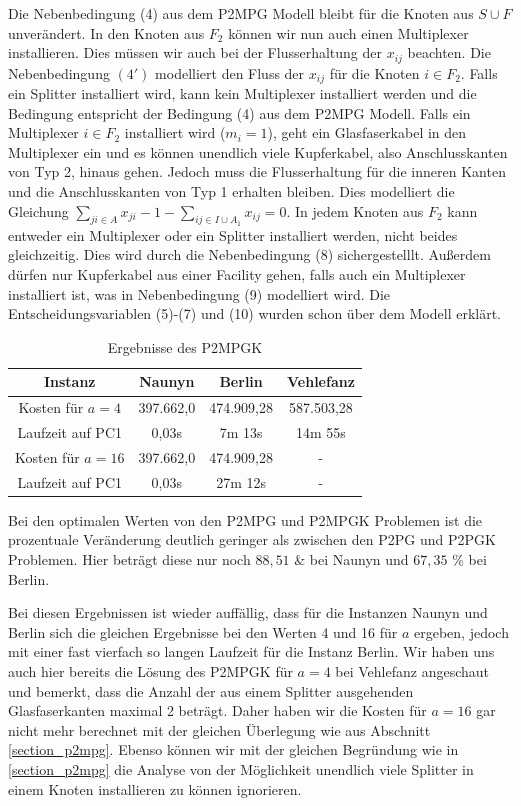 \documentclass[11pt,a4paper]{article}
\theoremstyle{my_th_style1}
\begin{document}
Die Nebenbedingung (4) aus dem P2MPG Modell bleibt für die Knoten aus $S \cup F$ unver\"andert.
In den Knoten aus $F_2$ können wir nun auch einen Multiplexer installieren.
Dies müssen wir auch bei der Flusserhaltung der $x_{ij}$ beachten.
Die Nebenbedingung \((4')\) modelliert den Fluss der $x_{ij}$ für die Knoten $i \in F_2$.
Falls ein Splitter installiert wird, kann kein Multiplexer installiert werden und die Bedingung entspricht der Bedingung (4) aus dem P2MPG Modell.
Falls ein Multiplexer $i \in F_2$ installiert wird ($m_i=1$), geht ein Glasfaserkabel in den Multiplexer ein und es k\"onnen unendlich viele Kupferkabel, also Anschlusskanten von Typ 2, hinaus gehen.
Jedoch muss die Flusserhaltung f\"ur die inneren Kanten und die Anschlusskanten von Typ 1 erhalten bleiben.
Dies modelliert die Gleichung $\displaystyle\sum_{ji \in A} x_{ji} -1 - \displaystyle\sum_{ij \in I \cup A_1} x_{ij}=0$.
In jedem Knoten aus $F_2$ kann entweder ein Multiplexer oder ein Splitter installiert werden, nicht beides gleichzeitig.
Dies wird durch die Nebenbedingung (8) sichergestelllt.
Außerdem d\"urfen nur Kupferkabel aus einer Facility gehen, falls auch ein Multiplexer installiert ist, was in Nebenbedingung (9) modelliert wird.
Die Entscheidungsvariablen (5)-(7) und (10) wurden schon \"uber dem Modell erkl\"art.   

 \begin{table}[h]
	\centering
	\begin{tabular}{c|c|c|c}
		Instanz & Naunyn & Berlin & Vehlefanz \\	
		\hline
		Kosten für $a=4$ & 397.662,0 & 474.909,28 & 587.503,28 \\
		Laufzeit auf PC1 & 0,03s & 7m 13s & 14m 55s \\
		\hline
		Kosten für $a=16$ & 397.662,0 & 474.909,28 & -\\
		Laufzeit auf PC1 & 0,03s & 27m 12s & - \\
	\end{tabular}
	\caption{Ergebnisse des P2MPGK}
	\label{P2MPGK}
\end{table}

Bei den optimalen Werten von den P2MPG und P2MPGK Problemen ist die prozentuale Ver\"anderung deutlich geringer als zwischen den P2PG und P2PGK Problemen.
Hier betr\"agt diese nur noch \(88,51\) \& bei Naunyn und \(67,35\) \% bei Berlin.

Bei diesen Ergebnissen ist wieder auff\"allig, dass f\"ur die Instanzen Naunyn und Berlin sich die gleichen Ergebnisse bei den Werten 4 und 16 f\"ur \(a\) ergeben, jedoch mit einer fast vierfach so langen Laufzeit f\"ur die Instanz Berlin.
Wir haben uns auch hier bereits die L\"osung des P2MPGK f\"ur \(a=4\) bei Vehlefanz angeschaut und bemerkt, dass die Anzahl der aus einem Splitter ausgehenden Glasfaserkanten maximal 2 betr\"agt.
Daher haben wir die Kosten f\"ur \(a = 16\) gar nicht mehr berechnet mit der gleichen \"Uberlegung wie aus Abschnitt \ref{section_p2mpg}.
Ebenso k\"onnen wir mit der gleichen Begr\"undung wie in \ref{section_p2mpg} die Analyse von der M\"oglichkeit unendlich viele Splitter in einem Knoten installieren zu k\"onnen ignorieren.
   
\end{document}
